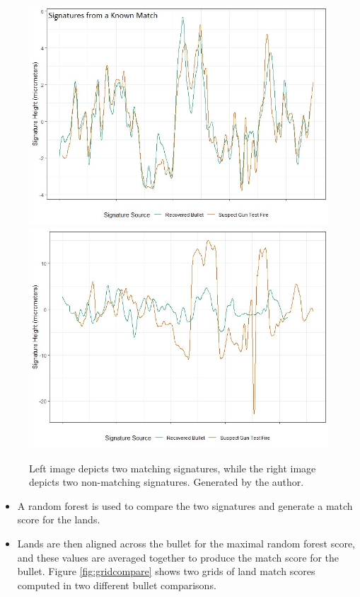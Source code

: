 \documentclass[print]{nuthesis}
\begin{document}
\begin{figure}

{\centering \includegraphics[width=0.49\linewidth]{images/Match_Signatures} \includegraphics[width=0.49\linewidth]{images/K995_NoMatch_Signatures} 

}

\caption[Left image depicts two matching signatures, while the right image depicts two non-matching signatures.]{Left image depicts two matching signatures, while the right image depicts two non-matching signatures. Generated by the author.}\label{fig:signaturecompare}
\end{figure}

\begin{itemize}
\item
  A random forest is used to compare the two signatures and generate a match score for the lands.
\item
  Lands are then aligned across the bullet for the maximal random forest score, and these values are averaged together to produce the match score for the bullet.
  Figure \ref{fig:gridcompare} shows two grids of land match scores computed in two different bullet comparisons.
\end{itemize}
\end{document}
